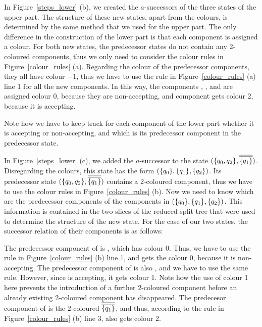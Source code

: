 In Figure~\ref{steps_lower} (b), we created the $a$-successors of the three states of the upper part. The structure of these new states, apart from the colours, is determined by the same method that we used for the upper part. The only difference in the construction of the lower part is that each component is assigned a colour. For both new states, the predecessor states do not contain any 2-coloured components, thus we only need to consider the colour rules in Figure~\ref{colour_rules} (a). Regarding the colour of the predecessor components, they all have colour $-1$, thus we have to use the rule in Figure~\ref{colour_rules} (a) line 1 for all the new components. In this way, the components , , and  are assigned colour 0, because they are non-accepting, and component  gets colour 2, because it is accepting.

Note how we have to keep track for each component of the lower part whether it is accepting or non-accepting, and which is its predecessor component in the predecessor state. 

In Figure~\ref{steps_lower} (c), we added the $a$-successor to the state $(\qqm02, \cl2{\qm1})$. Disregarding the colours, this state has the form $(\{q_{0}\}, \{q_{1}\}, \{q_{2}\})$. Its predecessor state $(\qqm02, \cl2{\qm1})$ contains a 2-coloured component, thus we have to use the colour rules in Figure~\ref{colour_rules} (b). Now we need to know which are the predecessor components of the components in $(\{q_{0}\}, \{q_{1}\}, \{q_{2}\})$. This information is contained in the two slices of the reduced split tree that were used to determine the structure of the new state. For the case of our two states, the successor relation of their components is as follows:

\begin{center}
\PredCompsOne
\end{center}

The predecessor component of  is , which has colour 0. Thus, we have to use the rule in Figure~\ref{colour_rules} (b) line 1, and  gets the colour 0, because it is non-accepting. The predecessor component of  is also , and we have to use the same rule. However, since  is accepting, it gets colour 1. Note how the use of colour 1 here prevents the introduction of a further 2-coloured component before an already existing 2-coloured component has disappeared. The predecesor component of  is the 2-coloured $\cl2{\qm1}$, and thus, according to the rule in Figure~\ref{colour_rules} (b) line 3,  also gets colour 2.

